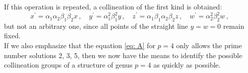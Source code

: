 \documentclass[leqno]{article}
\begin{document}
If this operation is repeated, a collineation of the first kind is obtained:
\begin{equation}\label{eq: 2.6}
x^\prime = \alpha_1 \alpha_2 \beta_1 \beta_2 x \, , \quad y^\prime = \alpha_1^2 \beta_1^2 y \, , \quad z^\prime = \alpha_1 \beta_1 \alpha_2 \beta_2 z \, , \quad w^\prime = \alpha_2^2 \beta_2^2 w \, , \tag{6}
\end{equation}
but not an arbitrary one, since all points of the straight line $ y = w = 0 $ remain fixed. \\
If we also emphasize that the equation \eqref{eq: A} for $ p = 4 $ only allows the prime number solutions 2, 3, 5, then we now have the means to identify the possible collineation groups of a structure of genus $ p = 4 $ as quickly as possible.
\end{document}

